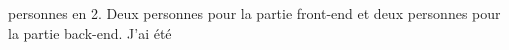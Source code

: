 \documentclass[a4paper, 11pt, french]{report}
\begin{document}
                                                                                                                                   personnes
                                                                                                                                   en
                                                                                                                                   2.
                                                                                                                                   Deux
                                                                                                                                   personnes
                                                                                                                                   pour
                                                                                                                                   la
                                                                                                                                   partie
                                                                                                                                   front-end
                                                                                                                                   et
                                                                                                                                   deux
                                                                                                                                   personnes
                                                                                                                                   pour
                                                                                                                                   la
                                                                                                                                   partie
                                                                                                                                   back-end.
                                                                                                                                   \newline
                                                                                                                                   J'ai
                                                                                                                                   été
\end{document}
